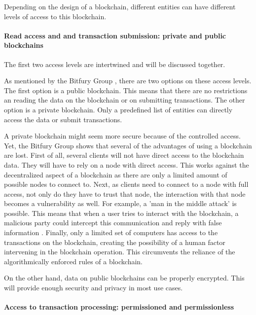 Depending on the design of a blockchain, different entities can have different levels of access to this blockchain.

\paragraph{Read access and and transaction submission: private and public blockchains}

The first two access levels are intertwined and will be discussed together.

As mentioned by the Bitfury Group \cite{bitfury-permissioned}, there are two options on these access levels. The first option is a public blockchain. This means that there are no restrictions an reading the data on the blockchain or on submitting transactions. The other option is a private blockchain. Only a predefined list of entities can directly access the data or submit transactions.

A private blockchain might seem more secure because of the controlled access.  Yet, the Bitfury Group \cite{bitfury-permissioned} shows that several of the advantages of using a blockchain are lost. First of all, several clients will not have direct access to the blockchain data. They will have to rely on a node with direct access. This works against the decentralized aspect of a blockchain as there are only a limited amount of possible nodes to connect to. Next, as clients need to connect to a node with full access, not only do they have to trust that node, the interaction with that node becomes a vulnerability as well. For example, a 'man in the middle attack' is possible. This means that when a user tries to interact with the blockchain, a malicious party could intercept this communication and reply with false information \cite{man-in-the-middle}. Finally, only a limited set of computers has access to the transactions on the blockchain, creating the possibility of a human factor intervening in the blockchain operation. This circumvents the reliance of the algorithmically enforced rules of a blockchain.

On the other hand, data on public blockchains can be properly encrypted. This will provide enough security and privacy in most use cases.

\paragraph{Access to transaction processing: permissioned and permissionless}

